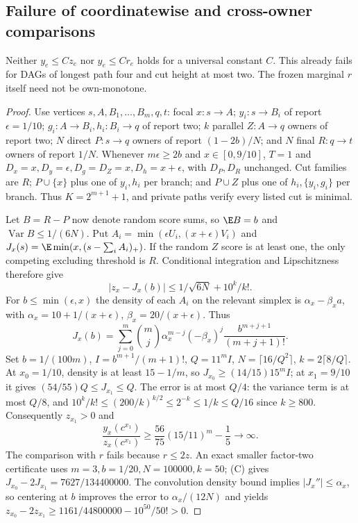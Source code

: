 \subsection{Failure of coordinatewise and cross-owner comparisons}
\begin{proposition}\label{noise:pointwise}
Neither $y_e\le Cz_e$ nor $y_e\le Cr_e$ holds for a universal constant
$C$. This already fails for DAGs of longest path four and cut height at
most two. The frozen marginal $r$ itself need not be own-monotone.
\end{proposition}
\begin{proof}
Use vertices $s,A,B_1,\ldots,B_m,q,t$: focal $x:s\to A$;
$y_i:s\to B_i$ of report $\epsilon=1/10$;
$g_i:A\to B_i,h_i:B_i\to q$ of report two;
$k$ parallel $Z:A\to q$ owners of report two;
$N$ direct $P:s\to q$ owners of report $(1-2b)/N$;
and $N$ final $R:q\to t$ owners of report $1/N$.
Whenever $m\epsilon\ge2b$ and $x\in[0,9/10]$, $T=1$ and
$D_x=x,D_y=\epsilon,D_g=D_Z=x,D_h=x+\epsilon$, with $D_P,D_R$ unchanged.
Cut families are $R$; $P\cup\{x\}$ plus one of $y_i,h_i$ per branch;
and $P\cup Z$ plus one of $h_i,\{y_i,g_i\}$ per branch.
Thus $K=2^{m+1}+1$, and private paths verify every listed cut is minimal.

Let $B=R-P$ now denote random score sums, so $\E B=b$ and
$\operatorname{Var}B\le1/(6N)$. Put
$A_i=\min(\epsilon U_i,(x+\epsilon)V_i)$ and
$J_x(s)=\E\min(x,(s-\sum_iA_i)_+)$.
If the random $Z$ score is at least one, the only competing excluding
threshold is $R$. Conditional integration and Lipschitzness therefore give
\[
 |z_x-J_x(b)|\le1/\sqrt{6N}+10^k/k!.
\]
For $b\le\min(\epsilon,x)$ the density of each $A_i$ on the relevant
simplex is $\alpha_x-\beta_xa$, with
$\alpha_x=10+1/(x+\epsilon)$, $\beta_x=20/(x+\epsilon)$. Thus
\[
 J_x(b)=\sum_{j=0}^m\binom mj\alpha_x^{m-j}(-\beta_x)^j
                      \frac{b^{m+j+1}}{(m+j+1)!}.       \tag{C}
\]
Set $b=1/(100m)$, $I=b^{m+1}/(m+1)!$, $Q=11^mI$,
$N=\lceil16/Q^2\rceil$, $k=2\lceil8/Q\rceil$.
At $x_0=1/10$, density is at least $15-1/m$, so
$J_{x_0}\ge(14/15)15^mI$; at $x_1=9/10$ it gives
$(54/55)Q\le J_{x_1}\le Q$.
The error is at most $Q/4$: the variance term is at most $Q/8$, and
$10^k/k!\le(200/k)^{k/2}\le2^{-k}\le1/k\le Q/16$ since $k\ge800$.
Consequently $z_{x_1}>0$ and
\[
 \frac{y_x(c^{x_1})}{z_x(c^{x_1})}
 \ge\frac{56}{75}(15/11)^m-\frac15\longrightarrow\infty.
\]
The comparison with $r$ fails because $r\le2z$.
An exact smaller factor-two certificate uses $m=3,b=1/20,N=100000,k=50$;
(C) gives $J_{x_0}-2J_{x_1}=7627/134400000$.
The convolution density bound implies $|J_x''|\le\alpha_x$, so centering
at $b$ improves the error to $\alpha_x/(12N)$ and yields
$z_{x_0}-2z_{x_1}\ge1161/44800000-10^{50}/50!>0$.


\end{proof}
